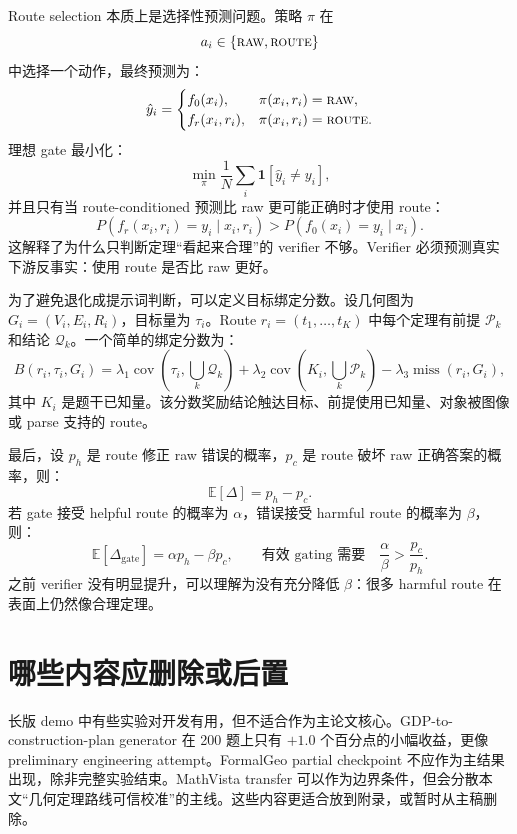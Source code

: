 \documentclass[UTF8,11pt]{ctexart}
\begin{document}
Route selection 本质上是选择性预测问题。策略 \(\pi\) 在
\[
a_i\in\{\textsc{raw},\textsc{route}\}
\]
中选择一个动作，最终预测为：
\begin{equation}
\hat{y}_i=
\begin{cases}
f_0(x_i), & \pi(x_i,r_i)=\textsc{raw},\\
f_r(x_i,r_i), & \pi(x_i,r_i)=\textsc{route}.
\end{cases}
\end{equation}
理想 gate 最小化：
\begin{equation}
\min_{\pi}
\frac{1}{N}
\sum_i
\mathbf{1}[\hat{y}_i\neq y_i],
\end{equation}
并且只有当 route-conditioned 预测比 raw 更可能正确时才使用 route：
\begin{equation}
P(f_r(x_i,r_i)=y_i\mid x_i,r_i)>
P(f_0(x_i)=y_i\mid x_i).
\label{eq:optimal-gate-core-zh}
\end{equation}
这解释了为什么只判断定理“看起来合理”的 verifier 不够。Verifier 必须预测真实下游反事实：使用 route 是否比 raw 更好。

为了避免退化成提示词判断，可以定义目标绑定分数。设几何图为 \(G_i=(V_i,E_i,R_i)\)，目标量为 \(\tau_i\)。Route \(r_i=(t_1,\ldots,t_K)\) 中每个定理有前提 \(\mathcal{P}_k\) 和结论 \(\mathcal{Q}_k\)。一个简单的绑定分数为：
\begin{equation}
B(r_i,\tau_i,G_i)
=
\lambda_1\operatorname{cov}\!\left(\tau_i,\bigcup_k\mathcal{Q}_k\right)
+\lambda_2\operatorname{cov}\!\left(K_i,\bigcup_k\mathcal{P}_k\right)
-\lambda_3\operatorname{miss}(r_i,G_i),
\label{eq:binding-core-zh}
\end{equation}
其中 \(K_i\) 是题干已知量。该分数奖励结论触达目标、前提使用已知量、对象被图像或 parse 支持的 route。

最后，设 \(p_h\) 是 route 修正 raw 错误的概率，\(p_c\) 是 route 破坏 raw 正确答案的概率，则：
\[
\mathbb{E}[\Delta]=p_h-p_c.
\]
若 gate 接受 helpful route 的概率为 \(\alpha\)，错误接受 harmful route 的概率为 \(\beta\)，则：
\begin{equation}
\mathbb{E}[\Delta_{\text{gate}}]
=
\alpha p_h-\beta p_c,
\qquad
\text{有效 gating 需要}\quad
\frac{\alpha}{\beta}>
\frac{p_c}{p_h}.
\label{eq:harm-condition-core-zh}
\end{equation}
之前 verifier 没有明显提升，可以理解为没有充分降低 \(\beta\)：很多 harmful route 在表面上仍然像合理定理。

\section{哪些内容应删除或后置}
长版 demo 中有些实验对开发有用，但不适合作为主论文核心。GDP-to-construction-plan generator 在 200 题上只有 \(+1.0\) 个百分点的小幅收益，更像 preliminary engineering attempt。FormalGeo partial checkpoint 不应作为主结果出现，除非完整实验结束。MathVista transfer 可以作为边界条件，但会分散本文“几何定理路线可信校准”的主线。这些内容更适合放到附录，或暂时从主稿删除。
\end{document}
